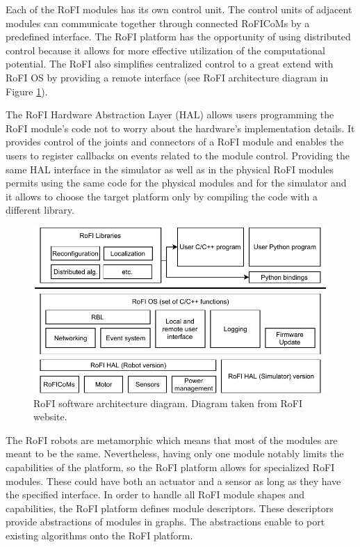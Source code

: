 \documentclass[
  printed, %
  color,   %
  notable, %
  oneside, %
  nolof,   %
  nolot,   %
  nocover,
]{fithesis3}
\begin{document}
Each of the RoFI modules has its own control unit.
The control units of adjacent modules can communicate together through connected RoFICoMs by a predefined interface.
The RoFI platform has the opportunity of using distributed control because it allows for more effective utilization of the computational potential.
The RoFI also simplifies centralized control to a great extend with RoFI OS by providing a remote interface (see RoFI architecture diagram in Figure \ref{fig:architecture}).

The RoFI Hardware Abstraction Layer (HAL)\label{hal} allows users programming the RoFI module's code not to worry about the hardware's implementation details.
It provides control of the joints and connectors of a RoFI module and enables the users to register callbacks on events related to the module control.
Providing the same HAL interface in the simulator as well as in the physical RoFI modules permits using the same code for the physical modules and for the simulator and it allows to choose the target platform only by compiling the code with a different library.

\begin{figure}
    \centering
    \includegraphics[width=\linewidth]{data/rofi_architecture.pdf}
    \caption{RoFI software architecture diagram. Diagram taken from RoFI website\cite{rofi-web}.}
    \label{fig:architecture}
\end{figure}

The RoFI robots are metamorphic which means that most of the modules are meant to be the same.
Nevertheless, having only one module notably limits the capabilities of the platform, so the RoFI platform allows for specialized RoFI modules.
These could have both an actuator and a sensor as long as they have the specified interface.
In order to handle all RoFI module shapes and capabilities, the RoFI platform defines module descriptors\cite{rofi-thesis}.
These descriptors provide abstractions of modules in graphs.
The abstractions enable to port existing algorithms onto the RoFI platform.
\end{document}
